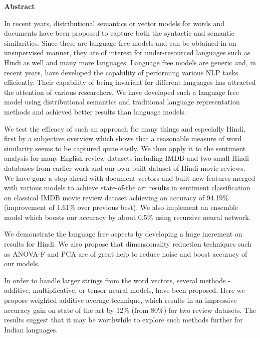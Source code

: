 \cleardoublepage

\begin{center}
	\huge{\textbf{Abstract}}
\end{center}

In recent years, distributional semantics or vector models for words and documents have been proposed to capture both the syntactic and semantic similarities. Since these are language free models and can be obtained in an unsupervised manner, they are of interest for under-resourced languages such as Hindi as well and many more languages. 
Language free models are generic and, in recent years, have developed the capability of performing various NLP tasks efficiently. Their capability of being invariant for different languages has attracted the attention of various researchers. We have developed such a language free model using distributional semantics and traditional language representation methods and achieved better results than language models.

We test the efficacy of such an approach for many things and especially Hindi, first by a subjective overview which shows that a reasonable measure of word similarity seems to be captured quite easily.  We then apply it to the sentiment analysis for many English review datasets including IMDB and two small Hindi databases from earlier work and our own built dataset of Hindi movie reviews. 
We have gone a step ahead with document vectors and built new features merged with various models to achieve state-of-the art results in sentiment classification on classical IMDB movie review dataset achieving an accuracy of 94.19\%(improvement of 1.61\% over previous best). We also implement an ensemble model which boosts our accuracy by about 0.5\% using recursive neural network.

We demonstrate the language free aspects by developing a huge increment on results for Hindi. We also propose that dimensionality reduction techniques such as ANOVA-F and PCA are of great help to reduce noise and boost accuracy of our models.

In order to handle larger strings from the word vectors, several methods - additive, multiplicative, or tensor neural models, have been proposed.  Here we propose weighted additive average technique, which results in an impressive accuracy gain on state of the art by 12\% (from 80\%) for two review datasets.  The results suggest that it may be worthwhile to explore such methods further for Indian languages.\\

